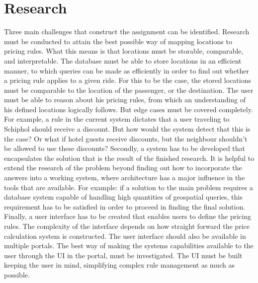 \section{Research}
Three main challenges that construct the assignment can be identified. Research must be conducted to attain the best possible way of mapping locations to pricing rules. What this means is that locations must be storable, comparable, and interpretable. The database must be able to store locations in an efficient manner, to which queries can be made as efficiently in order to find out whether a pricing rule applies to a given ride. For this to be the case, the stored locations must be comparable to the location of the passenger, or the destination. The user must be able to reason about his pricing rules, from which an understanding of his defined locations logically follows. But edge cases must be covered completely. For example, a rule in the current system dictates that a user traveling to Schiphol should receive a discount. But how would the system detect that this is the case? Or what if hotel guests receive discounts, but the neighbour shouldn't be allowed to use these discounts? Secondly, a system has to be developed that encapsulates the solution that is the result of the finished research. It is helpful to extend the research of the problem beyond finding out how to incorporate the answers into a working system, where architecture has a major influence in the tools that are available. For example: if a solution to the main problem requires a database system capable of handling high quantities of geospatial queries, this requirement has to be satisfied in order to proceed in finding the final solution. Finally, a user interface has to be created that enables users to define the pricing rules. The complexity of the interface depends on how straight forward the price calculation system is constructed. The user interface should also be available in multiple portals. The best way of making the systems capabilities available to the user through the UI in the portal, must be investigated. The UI must be built keeping the user in mind, simplifying complex rule management as much as possible.

